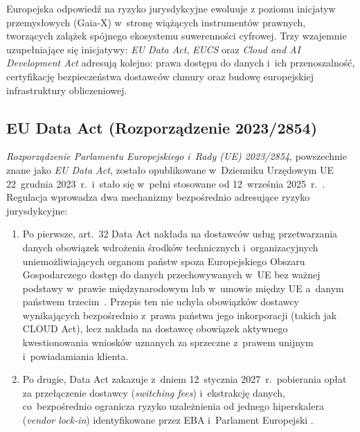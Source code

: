Europejska odpowiedź na ryzyko jurysdykcyjne ewoluuje z poziomu inicjatyw przemysłowych (Gaia-X) w~stronę wiążących instrumentów prawnych, tworzących zalążek spójnego ekosystemu suwerenności cyfrowej. Trzy wzajemnie uzupełniające
się inicjatywy: \textit{EU Data Act}, \textit{EUCS} oraz \textit{Cloud and AI Development Act} adresują kolejno: prawa dostępu do danych i~ich przenoszalność, certyfikację bezpieczeństwa dostawców chmury oraz budowę europejskiej infrastruktury obliczeniowej.

\subsection*{EU Data Act (Rozporządzenie 2023/2854)}

\textit{Rozporządzenie Parlamentu Europejskiego i~Rady (UE) 2023/2854}, powszechnie znane jako \textit{EU Data Act}, zostało opublikowane w~Dzienniku Urzędowym UE 22~grudnia 2023~r.\ i~stało się w~pełni stosowane od 12~września 2025~r.~\autocite{dataact2023}. Regulacja wprowadza dwa mechanizmy bezpośrednio adresujące ryzyko jurysdykcyjne:

\begin{enumerate}[label=(\roman*)]
    \item Po pierwsze, art.~32 Data Act nakłada na dostawców usług przetwarzania danych obowiązek wdrożenia środków technicznych i~organizacyjnych uniemożliwiających
    organom państw spoza Europejskiego Obszaru Gospodarczego dostęp do danych  przechowywanych w~UE bez ważnej podstawy w~prawie międzynarodowym lub
    w~umowie między UE a~danym państwem trzecim~\autocite{dataact2023}. Przepis ten nie uchyla obowiązków dostawcy wynikających bezpośrednio z~prawa
    państwa jego inkorporacji (takich jak CLOUD Act), lecz nakłada na dostawcę
    obowiązek aktywnego kwestionowania wniosków uznanych za sprzeczne z~prawem
    unijnym i~powiadamiania klienta.

    \item Po drugie, Data Act zakazuje z~dniem 12~stycznia 2027~r.\ pobierania opłat za przełączenie dostawcy (\textit{switching fees}) i~ekstrakcję danych, co~bezpośrednio ogranicza ryzyko uzależnienia od jednego hiperskalera (\textit{vendor lock-in}) identyfikowane przez EBA i~Parlament Europejski \autocite{dataact2023}.
\end{enumerate}

